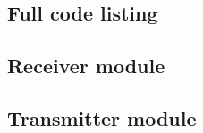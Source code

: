 \documentclass[12pt]{article}
\begin{document}
\begin{appendices}
	\section{Full code listing}
  \subsection{Receiver module}
  \label{appendix:code}
  
  \newpage
    \subsection{Transmitter module}
  \label{appendix:codeArduino}
  
  \end{appendices}
	
\end{document}
